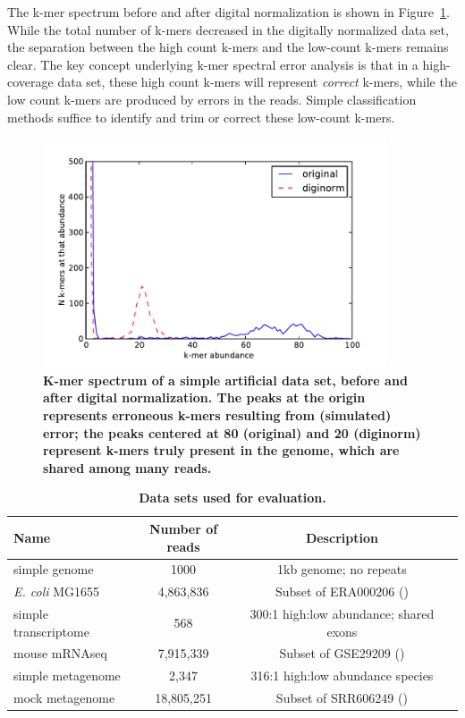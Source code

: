 \documentclass{article}
\begin{document}
The k-mer spectrum before and after digital normalization is shown in
Figure~\ref{fig:spectrum}.  While the total number of k-mers decreased
in the digitally normalized data set, the separation between the high
count k-mers and the low-count k-mers remains clear.  The key concept
underlying k-mer spectral error analysis is that in a high-coverage
data set, these high count k-mers will represent {\em correct} k-mers,
while the low count k-mers are produced by errors in the reads.
Simple classification methods suffice to identify and trim or correct
these low-count k-mers.

\begin{figure}[!ht]
 \centerline{\includegraphics[width=4in]{./figures/kmer-spectrum}}
\caption{\bf K-mer spectrum of a simple artificial data set, before
  and after digital normalization.  The peaks at the origin represents
  erroneous k-mers resulting from (simulated) error; the peaks
  centered at 80 (original) and 20 (diginorm) represent k-mers truly
  present in the genome, which are shared among many reads.}
\label{fig:spectrum}
\end{figure}



\begin{table}

\centering
\begin{tabular}{|l|c|c|l|}
\hline
Name & Number of reads & Description \\
\hline
simple genome & 1000 & 1kb genome; no repeats \\
{\em E. coli} MG1655 & 4,863,836 & Subset of ERA000206 (\cite{chitsaz}) \\
simple transcriptome & 568 & 300:1 high:low abundance; shared exons \\
mouse mRNAseq & 7,915,339 & Subset of GSE29209 (\cite{trinityrna}) \\
simple metagenome & 2,347 & 316:1 high:low abundance species \\
mock metagenome & 18,805,251 & Subset of SRR606249 (\cite{podar}) \\
\hline
\end{tabular}

\caption{{\bf Data sets used for evaluation.}}

\label{tab:data}
\end{table}
\end{document}
